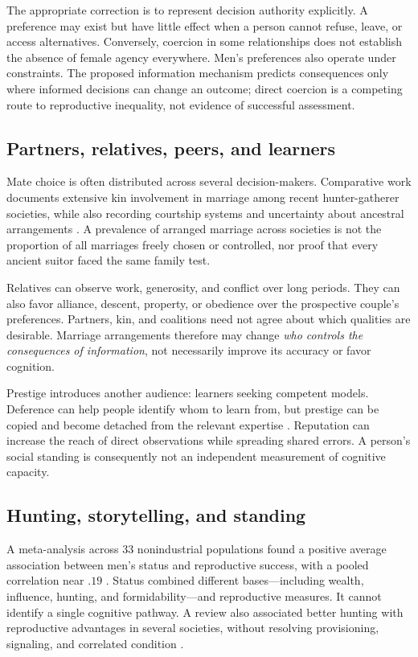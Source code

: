 \documentclass[10pt,twocolumn,letterpaper]{article}
\begin{document}
The appropriate correction is to represent decision authority explicitly. A preference may exist but have little effect when a person cannot refuse, leave, or access alternatives. Conversely, coercion in some relationships does not establish the absence of female agency everywhere. Men's preferences also operate under constraints. The proposed information mechanism predicts consequences only where informed decisions can change an outcome; direct coercion is a competing route to reproductive inequality, not evidence of successful assessment.

\subsection{Partners, relatives, peers, and learners}
Mate choice is often distributed across several decision-makers. Comparative work documents extensive kin involvement in marriage among recent hunter-gatherer societies, while also recording courtship systems and uncertainty about ancestral arrangements \citep{walker2011}. A prevalence of arranged marriage across societies is not the proportion of all marriages freely chosen or controlled, nor proof that every ancient suitor faced the same family test.

Relatives can observe work, generosity, and conflict over long periods. They can also favor alliance, descent, property, or obedience over the prospective couple's preferences. Partners, kin, and coalitions need not agree about which qualities are desirable. Marriage arrangements therefore may change \emph{who controls the consequences of information}, not necessarily improve its accuracy or favor cognition.

Prestige introduces another audience: learners seeking competent models. Deference can help people identify whom to learn from, but prestige can be copied and become detached from the relevant expertise \citep{henrich,duval}. Reputation can increase the reach of direct observations while spreading shared errors. A person's social standing is consequently not an independent measurement of cognitive capacity.

\subsection{Hunting, storytelling, and standing}
A meta-analysis across 33 nonindustrial populations found a positive average association between men's status and reproductive success, with a pooled correlation near $.19$ \citep{status}. Status combined different bases---including wealth, influence, hunting, and formidability---and reproductive measures. It cannot identify a single cognitive pathway. A review also associated better hunting with reproductive advantages in several societies, without resolving provisioning, signaling, and correlated condition \citep{hunters}.
\end{document}
